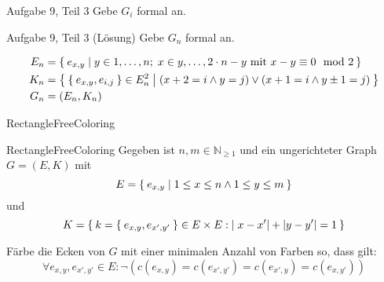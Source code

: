 \begin{frame}{Aufgabe 9, Teil 3}
Gebe $G_i$ formal an.

\begin{gallery}
\end{gallery}
\end{frame}

\begin{frame}{Aufgabe 9, Teil 3 (Lösung)}
Gebe $G_n$ formal an.

\begin{gallery}
\end{gallery}

\begin{align*}
    E_n &= \Set{e_{x,y} | y \in 1, \dots, n;\; x \in y, \dots, 2 \cdot n - y \text{ mit } x-y \equiv 0 \mod 2}\\
    K_n &= \Set{\Set{e_{x,y}, e_{i,j}} \in E_n^2 | (x+2=i \land y=j) \lor (x+1=i \land y\pm1=j)}\\
    G_n &= (E_n, K_n)
\end{align*}

\end{frame}

\begin{frame}{{\sc RectangleFreeColoring}}
    \begin{block}{{\sc RectangleFreeColoring}}
        Gegeben ist $n, m \in \mathbb{N}_{\geq 1}$ und ein 
        ungerichteter Graph $G = (E, K)$ mit 
            \[E = \Set{e_{x,y} | 1 \leq x \leq n \land 1 \leq y \leq m}\]
        und
            \[K = \Set{k=\Set{e_{x,y}, e_{x',y'}} \in E \times E : |x-x'| + |y-y'| = 1} \]
        
        Färbe die Ecken von $G$ mit einer minimalen Anzahl von Farben so, dass gilt:
            \[\forall e_{x,y}, e_{x',y'} \in E: \neg(c(e_{x,y}) = c(e_{x',y'}) = c(e_{x',y}) = c(e_{x,y'}))\]
    \end{block}
\end{frame}

